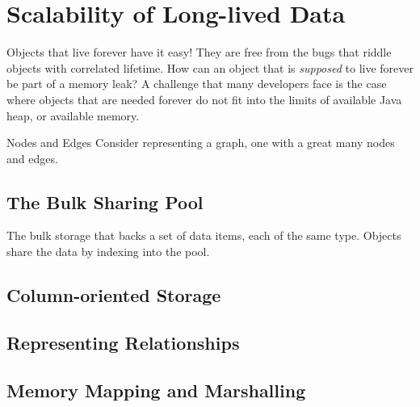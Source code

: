 
\chapter{Scalability of Long-lived Data}
\label{chapter:large-long-lived}

Objects that live forever have it easy! They are free from the bugs that riddle
objects with correlated lifetime. How can an object that is \emph{supposed}
to live forever be part of a memory leak? A challenge that many developers face
is the case where objects that are needed forever do not fit into the
limits of available Java heap, or available memory.

\begin{example}{Nodes and Edges}
Consider representing a graph, one with a great many nodes and edges.
\end{example}

\section{The Bulk Sharing Pool}
\label{sec:bulk-sharing-pool}

The bulk storage that backs a set of data items, each of the same type. Objects
share the data by indexing into the pool.

\section{Column-oriented Storage}

\section{Representing Relationships}

\section{Memory Mapping and Marshalling}